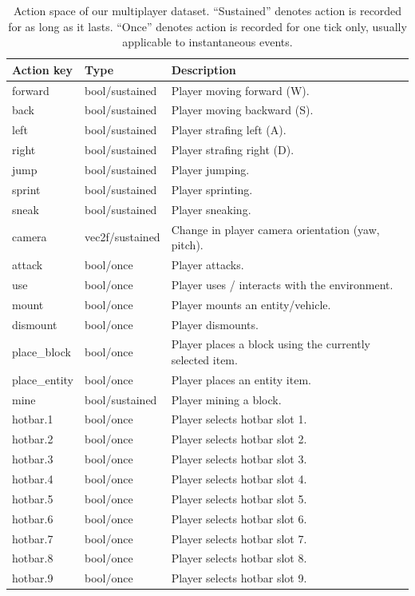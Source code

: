\begin{table}[h]
\centering
\small
{}
\caption{Action space of our multiplayer dataset. ``Sustained'' denotes action is recorded for as long as it lasts. ``Once'' denotes action is recorded for one tick only, usually applicable to instantaneous events.}
\label{tab:action_space}

\begin{tabularx}{\linewidth}{llY}
\toprule
\textbf{Action key} & \textbf{Type} & \textbf{Description} \\
\midrule
forward       & bool/sustained & Player moving forward (W). \\
back          & bool/sustained & Player moving backward (S). \\
left          & bool/sustained & Player strafing left (A). \\
right         & bool/sustained & Player strafing right (D). \\
jump          & bool/sustained & Player jumping. \\
sprint        & bool/sustained & Player sprinting. \\
sneak         & bool/sustained & Player sneaking. \\
camera        & vec2f/sustained & Change in player camera orientation (yaw, pitch). \\
attack        & bool/once & Player attacks. \\
use           & bool/once & Player uses / interacts with the environment. \\
mount         & bool/once & Player mounts an entity/vehicle. \\
dismount      & bool/once & Player dismounts. \\
place\_block  & bool/once & Player places a block using the currently selected item. \\
place\_entity & bool/once & Player places an entity item. \\
mine          & bool/sustained & Player mining a block. \\
hotbar.1      & bool/once & Player selects hotbar slot 1. \\
hotbar.2      & bool/once & Player selects hotbar slot 2. \\
hotbar.3      & bool/once & Player selects hotbar slot 3. \\
hotbar.4      & bool/once & Player selects hotbar slot 4. \\
hotbar.5      & bool/once & Player selects hotbar slot 5. \\
hotbar.6      & bool/once & Player selects hotbar slot 6. \\
hotbar.7      & bool/once & Player selects hotbar slot 7. \\
hotbar.8      & bool/once & Player selects hotbar slot 8. \\
hotbar.9      & bool/once & Player selects hotbar slot 9. \\
\bottomrule
\end{tabularx}
\end{table}



